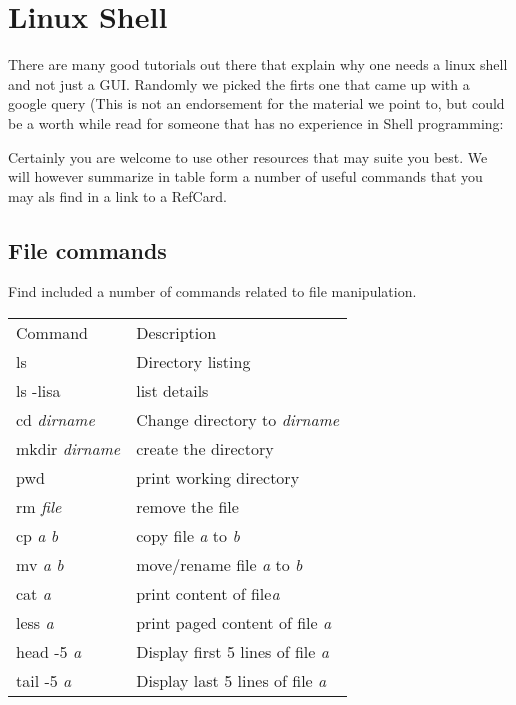 \FILENAME

\chapter{Linux Shell}
\label{C:linux-shell}

There are many good tutorials out there that explain why one needs a
linux shell and not just a GUI. Randomly we picked the firts one that
came up with a google query (This is not an endorsement for the material
we point to, but could be a worth while read for someone that has no
experience in Shell programming:


Certainly you are welcome to use other resources that may suite you
best. We will however summarize in table form a number of useful
commands that you may als find in a link to a RefCard.



\section{File commands}\label{file-commands}

Find included a number of commands related to file manipulation.

\begin{tabular}{ll}
Command & Description \\
ls & Directory listing\\
ls -lisa & list details \\
cd \emph{dirname} & Change directory to \emph{dirname} \\
mkdir \emph{dirname} & create the directory \\
pwd & print working directory \\
rm \emph{file} & remove the file \\
cp \emph{a} \emph{b} & copy file \emph{a} to \emph{b} \\
mv \emph{a} \emph{b} & move/rename file \emph{a} to \emph{b}\\
cat \emph{a} & print content of file\emph{a}\\
less \emph{a} & print paged content of file \emph{a}\\
head -5 \emph{a} & Display first 5 lines of file \emph{a}\\
tail -5 \emph{a} & Display last 5 lines of file \emph{a}
\end{tabular}

